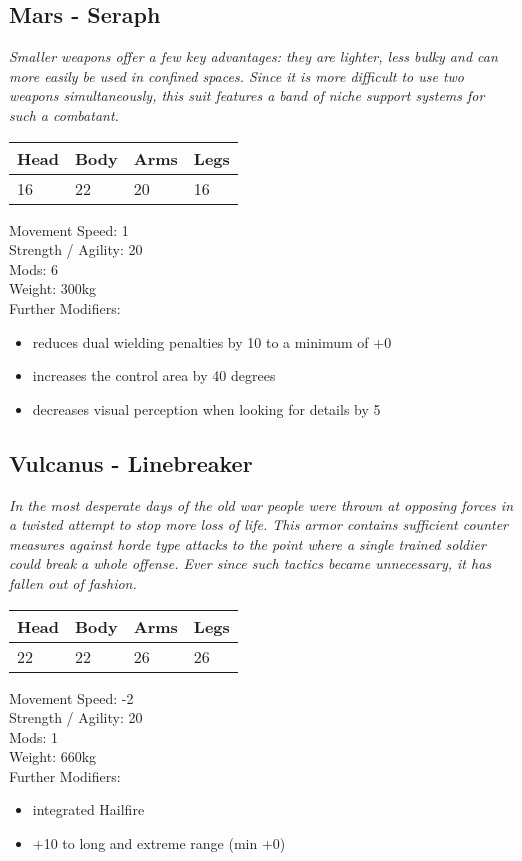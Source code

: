 \documentclass[12pt,a4paper,openany]{book}
\begin{document}
	\subsection{Mars - Seraph}
	\textit{Smaller weapons offer a few key advantages: they are lighter, less bulky and can more easily be used in confined spaces. Since it is more difficult to use two weapons simultaneously, this suit features a band of niche support systems for such a combatant.}\par
	\begin{tabular}{|l|l|l|l|}
		\hline
		Head & Body & Arms & Legs\\
		\hline
		16 & 22 & 20 & 16\\
		\hline
	\end{tabular}
	\par
	Movement Speed: 1\\
	Strength / Agility: 20\\
	Mods: 6\\
	Weight: 300kg\\
	Further Modifiers:
	\vspace{-8mm}
	\begin{itemize}
		\setlength\itemsep{-8mm}
		\item reduces dual wielding penalties by 10 to a minimum of +0
		\item increases the control area by 40 degrees
		\item decreases visual perception when looking for details by 5
	\end{itemize}
	\par
	\subsection{Vulcanus - Linebreaker}
	\textit{In the most desperate days of the old war people were thrown at opposing forces in a twisted attempt to stop more loss of life. This armor contains sufficient counter measures against horde type attacks to the point where a single trained soldier could break a whole offense. Ever since such tactics became unnecessary, it has fallen out of fashion.}\par
	\begin{tabular}{|l|l|l|l|}
		\hline
		Head & Body & Arms & Legs\\
		\hline
		22 & 22 & 26 & 26\\
		\hline
	\end{tabular}
	\par
	Movement Speed: -2\\
	Strength / Agility: 20\\
	Mods: 1\\
	Weight: 660kg\\
	Further Modifiers:
	\vspace{-8mm}
	\begin{itemize}
		\setlength\itemsep{-8mm}
		\item integrated Hailfire
		\item +10 to long and extreme range (min +0)
	\end{itemize}
	\par
\end{document}
